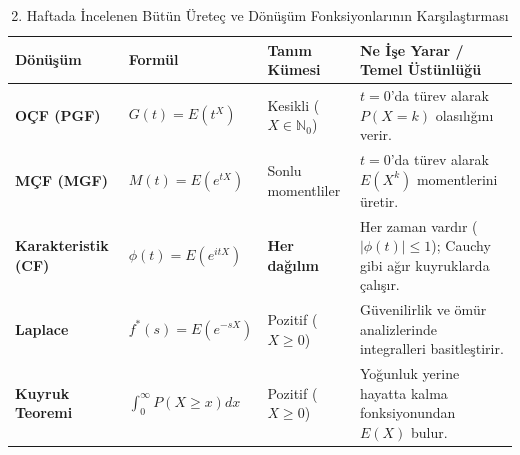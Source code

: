 \documentclass[12pt,a4paper]{article}
\begin{document}
\begin{table}[ht]
\centering
\small
\renewcommand{\arraystretch}{1.35}
\begin{tabularx}{\textwidth}{@{}l l l X@{}}
\toprule
\textbf{Dönüşüm} & \textbf{Formül} & \textbf{Tanım Kümesi} & \textbf{Ne İşe Yarar / Temel Üstünlüğü} \\ \midrule
\textbf{OÇF (PGF)} & $G(t) = E(t^X)$ & Kesikli ($X \in \mathbb{N}_0$) & $t=0$'da türev alarak $P(X=k)$ olasılığını verir. \\
\textbf{MÇF (MGF)} & $M(t) = E(e^{tX})$ & Sonlu momentliler & $t=0$'da türev alarak $E(X^k)$ momentlerini üretir. \\
\textbf{Karakteristik (CF)} & $\phi(t) = E(e^{itX})$ & \textbf{Her dağılım} & Her zaman vardır ($|\phi(t)| \le 1$); Cauchy gibi ağır kuyruklarda çalışır. \\
\textbf{Laplace} & $f^*(s) = E(e^{-sX})$ & Pozitif ($X \ge 0$) & Güvenilirlik ve ömür analizlerinde integralleri basitleştirir. \\
\textbf{Kuyruk Teoremi} & $\int_0^\infty P(X \ge x) dx$ & Pozitif ($X \ge 0$) & Yoğunluk yerine hayatta kalma fonksiyonundan $E(X)$ bulur. \\ \bottomrule
\end{tabularx}
\caption{2. Haftada İncelenen Bütün Üreteç ve Dönüşüm Fonksiyonlarının Karşılaştırması}
\end{table}
\end{document}
